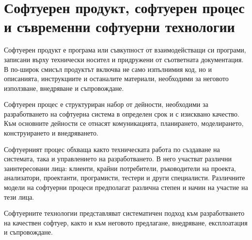 \begin{konspekt}
\end{konspekt}

\section{Софтуерен продукт, софтуерен процес и съвременни софтуерни технологии}\label{s:26.1}

\begin{defn}
Софтуерен продукт е програма или съвкупност от взаимодействащи си програми, записани върху технически носител и придружени от съответната документация. В по-широк смисъл продуктът включва не само изпълнимия код, но и описанията, инструкциите и останалите материали, необходими за неговото използване, внедряване и съпровождане.
\end{defn}

\begin{defn}
Софтуерен процес е структуриран набор от дейности, необходими за разработването на софтуерна система в определен срок и с изисквано качество. Към основните дейности се отнасят комуникацията, планирането, моделирането, конструирането и внедряването.
\end{defn}

Софтуерният процес обхваща както техническата работа по създаване на системата, така и управлението на разработването. В него участват различни заинтересовани лица: клиенти, крайни потребители, ръководители на проекта, анализатори, проектанти, програмисти, тестери и други специалисти. Различните модели на софтуерни процеси предполагат различна степен и начин на участие на тези лица.

\begin{defn}
Софтуерните технологии представляват систематичен подход към разработването на качествен софтуер, както и към неговото предлагане, внедряване, експлоатация и съпровождане.
\end{defn}

